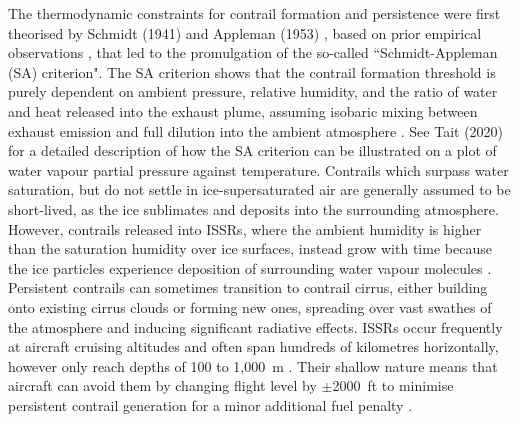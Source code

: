 The thermodynamic constraints for contrail formation and persistence were first theorised by Schmidt (1941) \cite{Schmidt1941} and Appleman (1953) \cite{Appleman1953}, based on prior empirical observations \cite{Schumann1997b}, that led to the promulgation of the so-called ``Schmidt-Appleman (SA) criterion". The SA criterion shows that the contrail formation threshold is purely dependent on ambient pressure, relative humidity, and the ratio of water and heat released into the exhaust plume, assuming isobaric mixing between exhaust emission and full dilution into the ambient atmosphere \cite{Schumann1996}. See Tait (2020) \cite{Tait2020} for a detailed description of how the SA criterion can be illustrated on a plot of water vapour partial pressure against temperature. Contrails which surpass water saturation, but do not settle in ice-supersaturated air are generally assumed to be short-lived, as the ice sublimates and deposits into the surrounding atmosphere. However, contrails released into ISSRs, where the ambient humidity is higher than the saturation humidity over ice surfaces, instead grow with time because the ice particles experience deposition of surrounding water vapour molecules \cite{Schumann2005}. Persistent contrails can sometimes transition to contrail cirrus, either building onto existing cirrus clouds or forming new ones, spreading over vast swathes of the atmosphere \cite{Minnis1998} and inducing significant radiative effects. ISSRs occur frequently at aircraft cruising altitudes and often span hundreds of kilometres horizontally, however only reach depths of 100 to 1,000~m \cite{Spichtinger2016, Dickson2010}. Their shallow nature means that aircraft can avoid them by changing flight level by $\pm$2000~ft to minimise persistent contrail generation for a minor additional fuel penalty \cite{Schumann2011}.


